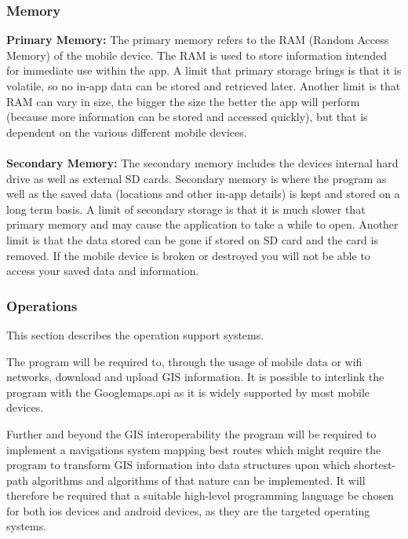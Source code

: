 \documentclass[12pt]{article}
\begin{document}
\subsubsection{Memory}
\textbf{Primary Memory:}
The primary memory refers to the RAM (Random Access Memory) of the mobile device. 
The RAM is used to store information intended for immediate use within the app. 
A limit that primary storage brings is that it is volatile, so no in-app data can be stored and retrieved later.
Another limit is that RAM can vary in size, the bigger the size the better the app will perform (because more information can be stored and accessed quickly), but that is dependent on the various different mobile devices.\\\\
\textbf{Secondary Memory:}
The secondary memory includes the devices internal hard drive as well as external SD cards.
Secondary memory is where the program as well as the saved data (locations and other in-app details) is kept and stored on a long term basis. 
A limit of secondary storage is that it is much slower that primary memory and may cause the application to take a while to open.
Another limit is that the data stored can be gone if stored on SD card and the card is removed.
If the mobile device is broken or destroyed you will not be able to access your saved data and information.


\subsubsection{Operations}



This section describes the operation support systems.

		

The program will be required to, through the usage of mobile data or wifi networks, download and upload GIS information. It is possible to interlink the program with the Googlemaps.api as it is widely supported by most mobile devices.

		

Further and beyond the GIS interoperability the program will be required to implement a navigations system mapping best routes which might require the program to transform GIS information into data structures upon which shortest-path algorithms and algorithms of that nature can be implemented. It will therefore be required that a suitable high-level programming language be chosen for both ios devices and android devices, as they are the targeted operating systems.
\end{document}
